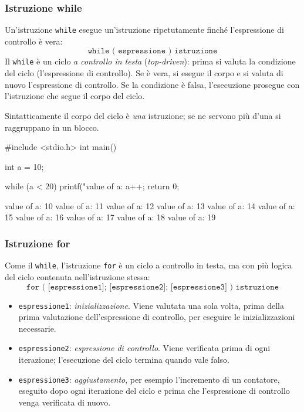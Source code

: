 \documentclass[11pt,a4paper]{article}
\begin{document}
\subsubsection{Istruzione while}

Un'istruzione \lstinline|while| esegue un'istruzione ripetutamente finché l'espressione di controllo è vera:
\[
\texttt{while ( espressione ) istruzione}
\]
Il \lstinline|while| è un ciclo \emph{a controllo in testa} (\emph{top-driven}): prima si valuta la condizione del ciclo (l'espressione di controllo). Se è vera, si esegue il corpo e si valuta di nuovo l'espressione di controllo. Se la condizione è falsa, l'esecuzione prosegue con l'istruzione che segue il corpo del ciclo.

Sintatticamente il corpo del ciclo è \emph{una} istruzione; se ne servono più d'una si raggruppano in un blocco.

\begin{esempio}
\begin{codice}
#include <stdio.h>
int main() {
    int a = 10;

    while (a < 20) {
        printf("value of a: %
        a++;
    }
    return 0;
}
\end{codice}
\begin{risultato}
value of a: 10
value of a: 11
value of a: 12
value of a: 13
value of a: 14
value of a: 15
value of a: 16
value of a: 17
value of a: 18
value of a: 19
\end{risultato}
\end{esempio}

\subsubsection{Istruzione for}

Come il \lstinline|while|, l'istruzione \lstinline|for| è un ciclo a controllo in testa, ma con più logica del ciclo contenuta nell'istruzione stessa:
\[
\texttt{for ( [espressione1]; [espressione2]; [espressione3] ) istruzione}
\]
\begin{itemize}
    \item \texttt{espressione1}: \emph{inizializzazione}. Viene valutata una sola volta, prima della prima valutazione dell'espressione di controllo, per eseguire le inizializzazioni necessarie.
    \item \texttt{espressione2}: \emph{espressione di controllo}. Viene verificata prima di ogni iterazione; l'esecuzione del ciclo termina quando vale falso.
    \item \texttt{espressione3}: \emph{aggiustamento}, per esempio l'incremento di un contatore, eseguito dopo ogni iterazione del ciclo e prima che l'espressione di controllo venga verificata di nuovo.
\end{itemize}
\end{document}
